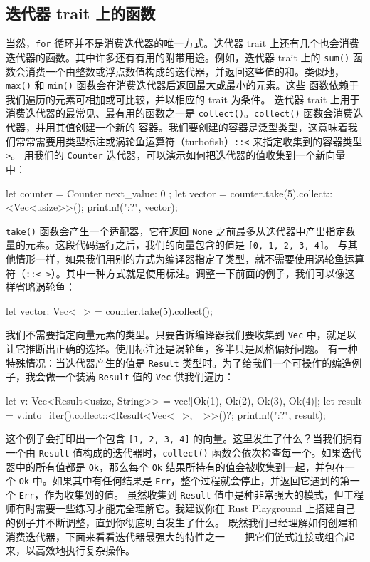 \subsection{迭代器 trait 上的函数}
\label{idx:idx_ab83be86}
当然，\texttt{for} 循环并不是消费迭代器的唯一方式。迭代器 trait 上还有几个也会消费迭代器的函数。其中许多还有有用的附带用途。例如，迭代器 trait 上的 \texttt{sum()} 函数会消费一个由整数或浮点数值构成的迭代器，并返回这些值的和。类似地，\texttt{max()} 和
\texttt{min()} 函数会在消费迭代器后返回最大或最小的元素。这些
函数依赖于我们遍历的元素可相加或可比较，并以相应的 trait 为条件。
迭代器 trait 上用于消费迭代器的最常见、最有用的函数之一是
\texttt{collect()}。\texttt{collect()} 函数会消费迭代器，并用其值创建一个新的
容器。我们要创建的容器是泛型类型，这意味着我们常常需要用类型标注或涡轮鱼运算符（turbofish）\texttt{::<} 来指定收集到的容器类型
\texttt{>}。
用我们的 \texttt{Counter} 迭代器，可以演示如何把迭代器的值收集到一个新向量中：
\begin{codebox}[rust]
let counter = Counter { next_value: 0 };
let vector = counter.take(5).collect::<Vec<usize>>();
println!("{:?}", vector);
\end{codebox}
\texttt{take()} 函数会产生一个适配器，它在返回 \texttt{None} 之前最多从迭代器中产出指定数量的元素。这段代码运行之后，我们的向量包含的值是
\texttt{[\allowbreak{}0,\allowbreak{} 1,\allowbreak{} 2,\allowbreak{} 3,\allowbreak{} 4]\allowbreak{}}。
与其他情形一样，如果我们用别的方式为编译器指定了类型，就不需要使用涡轮鱼运算符（\texttt{::< >}）。其中一种方式就是使用标注。调整一下前面的例子，我们可以像这样省略涡轮鱼：
\begin{codebox}[rust]
let vector: Vec<_> = counter.take(5).collect();
\end{codebox}
我们不需要指定向量元素的类型。只要告诉编译器我们要收集到 \texttt{Vec} 中，就足以让它推断出正确的选择。使用标注还是涡轮鱼，多半只是风格偏好问题。
\label{idx:idx_7a783e27}
有一种特殊情况：当迭代器产生的值是 \texttt{Result} 类型时。为了给我们一个可操作的编造例子，我会做一个装满 \texttt{Result} 值的 \texttt{Vec} 供我们遍历：
\begin{codebox}[rust]
let v: Vec<Result<usize, String>> = vec![Ok(1), Ok(2), Ok(3), Ok(4)];
let result = v.into_iter().collect::<Result<Vec<_>, _>>()?;
println!("{:?}", result);
\end{codebox}
这个例子会打印出一个包含 \texttt{[\allowbreak{}1,\allowbreak{} 2,\allowbreak{} 3,\allowbreak{} 4]\allowbreak{}} 的向量。这里发生了什么？当我们拥有一个由 \texttt{Result} 值构成的迭代器时，\texttt{collect()} 函数会依次检查每一个。如果迭代器中的所有值都是 \texttt{Ok}，那么每个 \texttt{Ok} 结果所持有的值会被收集到一起，并包在一个 \texttt{Ok} 中。如果其中有任何结果是 \texttt{Err}，整个过程就会停止，并返回它遇到的第一个
\texttt{Err}，作为收集到的值。
虽然收集到 \texttt{Result} 值中是种非常强大的模式，但工程师有时需要一些练习才能完全理解它。我建议你在 Rust Playground 上搭建自己的例子并不断调整，直到你彻底明白发生了什么。
既然我们已经理解如何创建和消费迭代器，下面来看看迭代器最强大的特性之一——把它们链式连接或组合起来，以高效地执行复杂操作。
